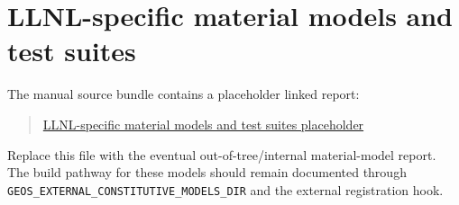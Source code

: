 \section{LLNL-specific material models and test suites}
The manual source bundle contains a placeholder linked report:
\begin{quote}
\href{linked_reports/llnl_specific_material_models_and_test_suites.pdf}{LLNL-specific material models and test suites placeholder}
\end{quote}
Replace this file with the eventual out-of-tree/internal material-model report.  The build pathway for these models should remain documented through \texttt{GEOS\_EXTERNAL\_CONSTITUTIVE\_MODELS\_DIR} and the external registration hook.
